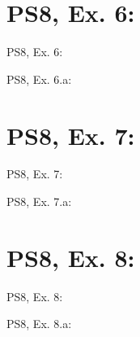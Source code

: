 \section{PS8, Ex. 6: }

\begin{frame}{PS8, Ex. 6: }
  \begin{multicols}{2}
    \vfill\null\columnbreak
    \vfill
  \end{multicols}
\end{frame}

\begin{frame}{PS8, Ex. 6.a: }
  \begin{multicols}{2}
    \vfill\null\columnbreak
    \vfill
  \end{multicols}
\end{frame}



\section{PS8, Ex. 7: }

\begin{frame}{PS8, Ex. 7: }
  \begin{multicols}{2}
    \vfill\null\columnbreak
    \vfill
  \end{multicols}
\end{frame}

\begin{frame}{PS8, Ex. 7.a: }
  \begin{multicols}{2}
    \vfill\null\columnbreak
    \vfill
  \end{multicols}
\end{frame}



\section{PS8, Ex. 8: }

\begin{frame}{PS8, Ex. 8: }
  \begin{multicols}{2}
    \vfill\null\columnbreak
    \vfill
  \end{multicols}
\end{frame}

\begin{frame}{PS8, Ex. 8.a: }
  \begin{multicols}{2}
    \vfill\null\columnbreak
    \vfill
  \end{multicols}
\end{frame}



